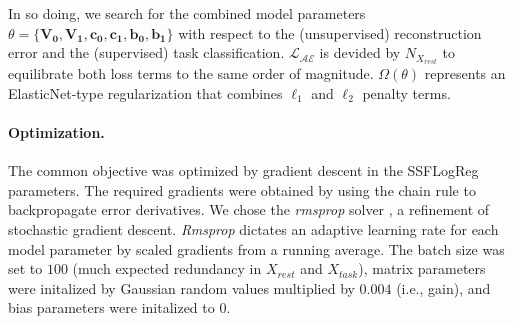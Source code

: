 \documentclass{article} %
\begin{document}
In so doing, we search for the combined model parameters
$\theta=\{\mathbf{V_0,V_1,c_0, c_1, b_0, b_1}\}$
with respect to the (unsupervised) reconstruction error and the
(supervised) task classification.
${\mathcal{L_{AE}}}$ is devided by ${N_{X_{rest}}}$ to equilibrate both
loss terms to the same order of magnitude.
\(\Omega(\theta)\) represents an ElasticNet-type regularization
that combines $\ell_1$ and $\ell_2$ penalty terms.


\paragraph{Optimization.}
The common objective was optimized
by gradient descent in the SSFLogReg parameters.
The required gradients were obtained by using the chain rule to
backpropagate error derivatives.
We chose the \textit{rmsprop} solver \cite{rmsprop},
a refinement of stochastic gradient descent.
\textit{Rmsprop} dictates an adaptive learning rate
for each model parameter by
scaled gradients from a running average.
The batch size was set to $100$
(much expected redundancy in $X_{rest}$ and $X_{task}$),
matrix parameters were initalized by Gaussian random values multiplied
by $0.004$ (i.e., gain), and
bias parameters were initalized to $0$.
\end{document}
